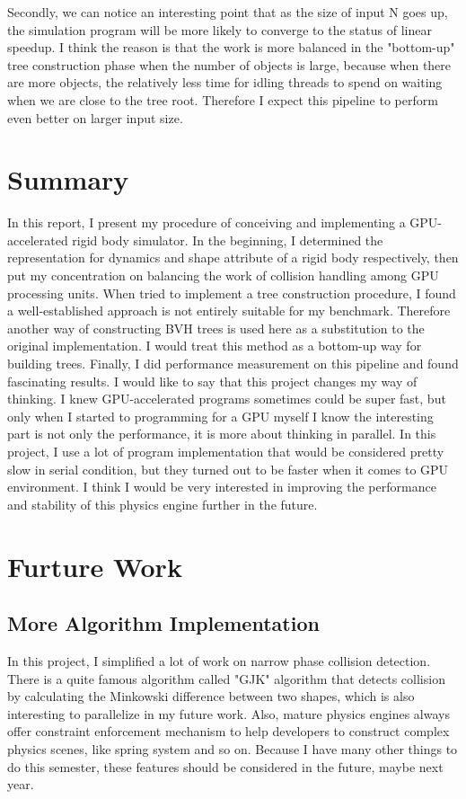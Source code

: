\documentclass[11pt]{article}
\begin{document}
Secondly, we can notice an interesting point that as the size of input N goes up, the simulation program will be more likely to converge to the status of linear speedup. I think the reason is that the work is more balanced in the "bottom-up" tree construction phase when the number of objects is large, because when there are more objects, the relatively less time for idling threads to spend on waiting when we are close to the tree root. Therefore I expect this pipeline to perform even better on larger input size.

\section{Summary}
\label{sec:org631426c}
In this report, I present my procedure of conceiving and implementing a GPU-accelerated rigid body simulator. In the beginning, I determined the representation for dynamics and shape attribute of a rigid body respectively, then put my concentration on balancing the work of collision handling among GPU processing units. When tried to implement a tree construction procedure, I found a well-established approach is not entirely suitable for my benchmark. Therefore another way of constructing BVH trees is used here as a substitution to the original implementation. I would treat this method as a bottom-up way for building trees. Finally, I did performance measurement on this pipeline and found fascinating results.
I would like to say that this project changes my way of thinking. I knew GPU-accelerated programs sometimes could be super fast, but only when I started to programming for a GPU myself I know the interesting part is not only the performance, it is more about thinking in parallel. In this project, I use a lot of program implementation that would be considered pretty slow in serial condition, but they turned out to be faster when it comes to GPU environment. I think I would be very interested in improving the performance and stability of this physics engine further in the future.

\section{Furture Work}
\label{sec:orge4ece62}
\subsection{More Algorithm Implementation}
\label{sec:orgb6e99a1}
In this project, I simplified a lot of work on narrow phase collision detection. There is a quite famous algorithm called "GJK" algorithm that detects collision by calculating the Minkowski difference between two shapes, which is also interesting to parallelize in my future work. Also, mature physics engines always offer constraint enforcement mechanism to help developers to construct complex physics scenes, like spring system and so on. Because I have many other things to do this semester, these features should be considered in the future, maybe next year.
\end{document}
